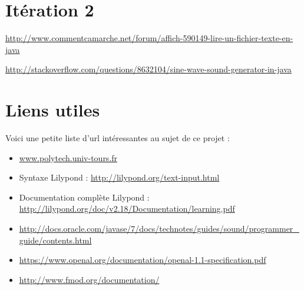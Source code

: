 \documentclass{EPUProjetPeiP}
\begin{document}
\chapter{Itération 2}



\begin{thebibliography}{99}
\item \url{http://www.commentcamarche.net/forum/affich-590149-lire-un-fichier-texte-en-java}
\item \url{http://stackoverflow.com/questions/8632104/sine-wave-sound-generator-in-java}
\label{sec:biblio}
\end{thebibliography}


\appendix
{}


\chapter{Liens utiles\label{sec:liens_utiles}}
Voici une petite liste d'url intéressantes au sujet de ce projet :

\begin{itemize}
\item \url{www.polytech.univ-tours.fr}
\item Syntaxe Lilypond : \url{http://lilypond.org/text-input.html}
\item Documentation complète Lilypond : \url{http://lilypond.org/doc/v2.18/Documentation/learning.pdf}
\item \url{http://docs.oracle.com/javase/7/docs/technotes/guides/sound/programmer_guide/contents.html}
\item \url{https://www.openal.org/documentation/openal-1.1-specification.pdf}
\item \url{http://www.fmod.org/documentation/}
\end{itemize}







\makedernierepage
\end{document}
